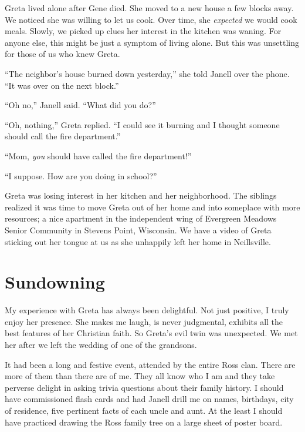 \documentclass[
  letterpaper,
  DIV=11,
  numbers=noendperiod]{scrreprt}
\begin{document}

Greta lived alone after Gene died. She moved to a new house a few blocks
away. We noticed she was willing to let us cook. Over time, she
\emph{expected} we would cook meals. Slowly, we picked up clues her
interest in the kitchen was waning. For anyone else, this might be just
a symptom of living alone. But this was unsettling for those of us who
knew Greta.

``The neighbor's house burned down yesterday,'' she told Janell over the
phone. ``It was over on the next block.''

``Oh no,'' Janell said. ``What did you do?''

``Oh, nothing,'' Greta replied. ``I could see it burning and I thought
someone should call the fire department.''

``Mom, \emph{you} should have called the fire department!''

``I suppose. How are you doing in school?''

Greta was losing interest in her kitchen and her neighborhood. The
siblings realized it was time to move Greta out of her home and into
someplace with more resources; a nice apartment in the independent wing
of Evergreen Meadows Senior Community in Stevens Point, Wisconsin. We
have a video of Greta sticking out her tongue at us as she unhappily
left her home in Neillsville.


\chapter*{Sundowning}\label{sundowning}


My experience with Greta has always been delightful. Not just positive,
I truly enjoy her presence. She makes me laugh, is never judgmental,
exhibits all the best features of her Christian faith. So Greta's evil
twin was unexpected. We met her after we left the wedding of one of the
grandsons.

It had been a long and festive event, attended by the entire Ross clan.
There are more of them than there are of me. They all know who I am and
they take perverse delight in asking trivia questions about their family
history. I should have commissioned flash cards and had Janell drill me
on names, birthdays, city of residence, five pertinent facts of each
uncle and aunt. At the least I should have practiced drawing the Ross
family tree on a large sheet of poster board.
\end{document}
